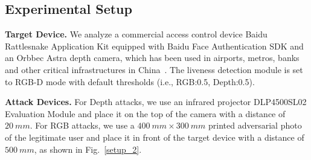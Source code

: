 \begin{table}[pt]
	\caption{Attack Effectiveness of \texttt{DepthFake} on a Commercial Access Control Device}
	\vspace{-0.15in}
	\begin{center}
		\label{commercial_asr}
	\end{center}
	\vspace{-0.15in}
\end{table}

\subsection{Experimental Setup}
\textbf{Target Device.} We analyze a commercial access control device Baidu Rattlesnake Application Kit equipped with Baidu Face Authentication SDK and an Orbbec Astra depth camera, which has been used in airports, metros, banks and other critical infrastructures in China~\cite{baidu_customer}.
The liveness detection module is set to RGB-D mode with default thresholds  (i.e., RGB:0.5, Depth:0.5).

\textbf{Attack Devices.} For Depth attacks, we use an infrared projector DLP4500SL02 Evaluation Module and place it on the top of the camera with a distance of $20~mm$. For RGB attacks, we use a $400~mm\times300~mm$ printed adversarial photo of the legitimate user and place it in front of the target device with a distance of $500~mm$, as shown in Fig.~\ref{setup_2}.


